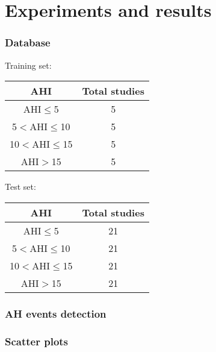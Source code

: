 \documentclass{beamer}
\begin{document}
\section{Experiments and results}
\begin{frame}
\frametitle {Database}
Training set:
\begin{center}
\begin{tabular}{c c}
\hline
AHI & Total studies \\
\hline
AHI$\leq$5 & 5\\
5$<$AHI$\leq$10 & 5\\
10$<$AHI$\leq$15 & 5\\
AHI$>$15 & 5\\
\hline
\end{tabular}
\end{center}
\pause
Test set:
\begin{center}
\begin{tabular}{c c}
\hline
AHI & Total studies \\
\hline
AHI$\leq$5 & 21\\
5$<$AHI$\leq$10 & 21\\
10$<$AHI$\leq$15 & 21\\
AHI$>$15 & 21\\
\hline
\end{tabular}
\end{center}
\end{frame}
\begin{frame}
\frametitle {AH events detection}
\begin{figure}
\end{figure}
\end{frame}
\begin{frame}
\frametitle {Scatter plots}
\begin{figure}
  \end{figure}
\end{frame}
\end{document}
